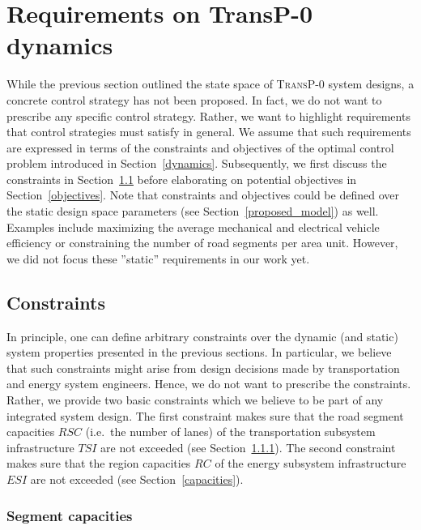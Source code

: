 \section{Requirements on \textbf{TransP-0} dynamics}
\label{requirements}

While the previous section outlined the state space of \textsc{TransP-0} system designs, a concrete control strategy has not been proposed. In fact, we do not want to prescribe any specific control strategy. Rather, we want to highlight requirements that control strategies must satisfy in general. We assume that such requirements are expressed in terms of the constraints and objectives of the optimal control problem introduced in Section~\ref{dynamics}. Subsequently, we first discuss the constraints in Section~\ref{constraints} before elaborating on potential objectives in Section~\ref{objectives}. Note that constraints and objectives could be defined over the static design space parameters (see Section~\ref{proposed_model}) as well. Examples include maximizing the average mechanical and electrical vehicle efficiency or constraining the number of road segments per area unit. However, we did not focus these ''static'' requirements in our work yet.

\subsection{Constraints}
\label{constraints}

In principle, one can define arbitrary constraints over the dynamic (and static) system properties presented in the previous sections. In particular, we believe that such constraints might arise from design decisions made by transportation and energy system engineers. Hence, we do not want to prescribe the constraints. Rather, we provide two basic constraints which we believe to be part of any integrated system design. The first constraint makes sure that the road segment capacities $RSC$ (i.e.\ the number of lanes) of the transportation subsystem infrastructure $TSI$ are not exceeded (see Section~\ref{collisions}). The second constraint makes sure that the region capacities $RC$ of the energy subsystem infrastructure $ESI$ are not exceeded (see Section~\ref{capacities}).

\subsubsection{Segment capacities}
\label{collisions}

